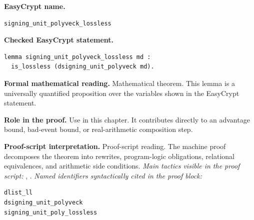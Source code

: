 \begin{formaltheorem}
\noindent\textbf{EasyCrypt name.}
\begin{lstlisting}[language=EasyCrypt,basicstyle=\ttfamily\scriptsize]
signing_unit_polyveck_lossless
\end{lstlisting}
\noindent\textbf{Checked EasyCrypt statement.}
\begin{lstlisting}[language=EasyCrypt,basicstyle=\ttfamily\scriptsize]
lemma signing_unit_polyveck_lossless md :
  is_lossless (dsigning_unit_polyveck md).
\end{lstlisting}
\noindent\textbf{Formal mathematical reading.}
Mathematical theorem. This lemma is a universally quantified proposition over the variables shown in the EasyCrypt statement.

\noindent\textbf{Role in the proof.}
Use in this chapter. It contributes directly to an advantage bound, bad-event bound, or real-arithmetic composition step.

\noindent\textbf{Proof-script interpretation.}
Proof-script reading. The machine proof decomposes the theorem into rewrites, program-logic obligations, relational equivalences, and arithmetic side conditions.
\emph{Main tactics visible in the proof script:} , .
\emph{Named identifiers syntactically cited in the proof block:}
\begin{lstlisting}[language=EasyCrypt,basicstyle=\ttfamily\scriptsize]
dlist_ll
dsigning_unit_polyveck
signing_unit_poly_lossless
\end{lstlisting}

\end{formaltheorem}

